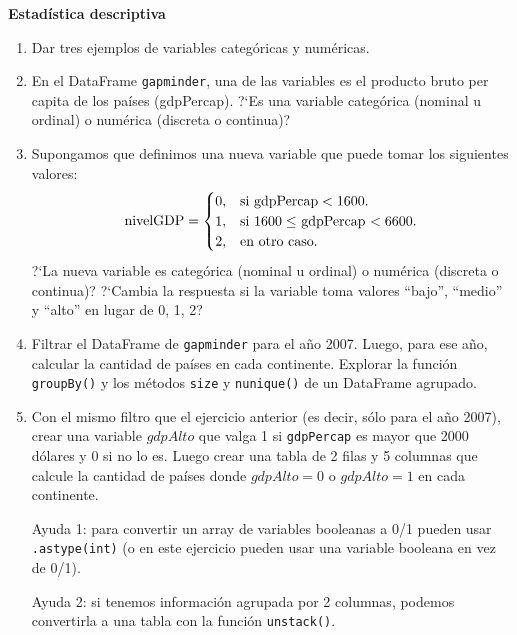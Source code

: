 \documentclass[a4paper,11pt]{article}
\theoremstyle{definition}
\begin{document}
\textbf{\large Estad\'istica descriptiva}
\begin{enumerate}[resume]

\item Dar tres ejemplos de variables categ\'oricas y num\'ericas.

\item En el DataFrame \lstinline{gapminder}, una de las variables es el producto bruto per capita de los pa\'ises (gdpPercap). ?`Es una variable categ\'orica (nominal u ordinal) o num\'erica (discreta o continua)?

\item Supongamos que definimos una nueva variable que puede tomar los siguientes valores:
\[
\text{nivelGDP} = \begin{cases}
0, & \text{si \lstinline{gdpPercap}} < 1600. \\
1, & \text{si $1600 \le $ \lstinline{gdpPercap} $< 6600$}. \\
2, & \text{en otro caso.} \\
\end{cases}
\]
?`La nueva variable
 es categ\'orica (nominal u ordinal) o num\'erica (discreta o continua)? ?`Cambia la respuesta si la variable
 toma valores ``bajo'', ``medio'' y ``alto'' en lugar de 0, 1, 2?

\item Filtrar el DataFrame de \lstinline{gapminder} para el a\~no 2007. Luego, para ese a\~no, calcular la cantidad de pa\'ises en cada continente. Explorar la función \lstinline{groupBy()} y los métodos \lstinline{size} y \lstinline{nunique()} de un DataFrame agrupado.

\item Con el mismo filtro que el ejercicio anterior (es decir, s\'olo para el a\~no 2007), crear una variable $gdpAlto$
 que valga 1 si \lstinline{gdpPercap} es mayor que 2000 d\'olares y 0 si no lo es. Luego crear una tabla de 2 filas y 5 columnas que calcule la cantidad de pa\'ises donde $gdpAlto = 0$ o $gdpAlto = 1$  en cada continente.

 Ayuda 1: para convertir un array de variables booleanas a 0/1 pueden usar \lstinline{.astype(int)} (o en este ejercicio pueden usar una variable booleana en vez de 0/1).

 Ayuda 2: si tenemos informaci\'on agrupada por 2 columnas, podemos convertirla a una tabla con la funci\'on \lstinline{unstack()}.



\end{enumerate}
\end{document}
